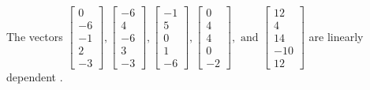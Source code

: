\begin{exercise}
\begin{exerciseStatement}
  \end{exerciseStatement}
  \begin{exerciseAnswer}
   The vectors \(\left[\begin{array}{r}
0 \\
-6 \\
-1 \\
2 \\
-3
\end{array}\right] , \left[\begin{array}{r}
-6 \\
4 \\
-6 \\
3 \\
-3
\end{array}\right] , \left[\begin{array}{r}
-1 \\
5 \\
0 \\
1 \\
-6
\end{array}\right] , \left[\begin{array}{r}
0 \\
4 \\
4 \\
0 \\
-2
\end{array}\right] , \text{ and } \left[\begin{array}{r}
12 \\
4 \\
14 \\
-10 \\
12
\end{array}\right]\) are 
  	 linearly dependent  .
  


  \end{exerciseAnswer}
\end{exercise}